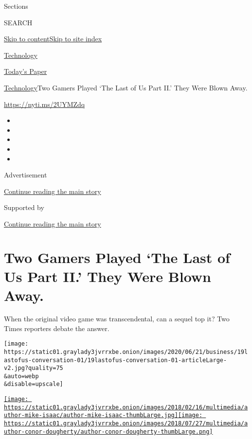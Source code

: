 Sections

SEARCH

\protect\hyperlink{site-content}{Skip to
content}\protect\hyperlink{site-index}{Skip to site index}

\href{https://www.nytimes3xbfgragh.onion/section/technology}{Technology}

\href{https://myaccount.nytimes3xbfgragh.onion/auth/login?response_type=cookie\&client_id=vi}{}

\href{https://www.nytimes3xbfgragh.onion/section/todayspaper}{Today's
Paper}

\href{/section/technology}{Technology}\textbar{}Two Gamers Played `The
Last of Us Part II.' They Were Blown Away.

\url{https://nyti.ms/2UYMZdq}

\begin{itemize}
\item
\item
\item
\item
\item
\end{itemize}

Advertisement

\protect\hyperlink{after-top}{Continue reading the main story}

Supported by

\protect\hyperlink{after-sponsor}{Continue reading the main story}

\hypertarget{two-gamers-played-the-last-of-us-part-ii-they-were-blown-away}{%
\section{Two Gamers Played `The Last of Us Part II.' They Were Blown
Away.}\label{two-gamers-played-the-last-of-us-part-ii-they-were-blown-away}}

When the original video game was transcendental, can a sequel top it?
Two Times reporters debate the answer.

\texttt{[image: https://static01.graylady3jvrrxbe.onion/images/2020/06/21/business/19lastofus-conversation-01/19lastofus-conversation-01-articleLarge-v2.jpg?quality=75\\\&auto=webp\\\&disable=upscale]}

\href{https://www.nytimes3xbfgragh.onion/by/mike-isaac}{\texttt{[image: https://static01.graylady3jvrrxbe.onion/images/2018/02/16/multimedia/author-mike-isaac/author-mike-isaac-thumbLarge.jpg]}}\href{https://www.nytimes3xbfgragh.onion/by/conor-dougherty}{\texttt{[image: https://static01.graylady3jvrrxbe.onion/images/2018/07/27/multimedia/author-conor-dougherty/author-conor-dougherty-thumbLarge.png]}}

